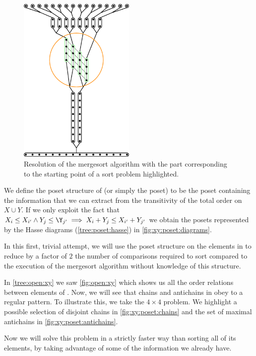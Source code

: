 \begin{figure}
\centering
\includegraphics[width=0.5\textwidth,angle=90]{fig/x+y/poset/mergexy}
\caption{Resolution of the mergesort algorithm with the part
corresponding to the starting point of a sort \XY problem highlighted.}
\label{fig:xy:poset:mergexy}
\end{figure}

We define the poset structure of \XY (or simply the \XY poset) to be the poset
containing the information that we can extract from the transitivity of the
total order on \(X \cup Y\). If we only exploit the fact that
\(X_i \le X_{i'} \land Y_j \le \Y_{j'} \implies X_i + Y_j \le X_{i'} + Y_{j'}\)
we obtain the posets represented by the Hasse diagrams (\ref{tree:poset:hasse})
in \ref{fig:xy:poset:diagrams}.

In this first, trivial attempt, we will use the poset structure on the
elements in \XY to reduce by a factor of $2$ the number of comparisons required
to sort \XY compared to the execution of the mergesort algorithm without
knowledge of this structure.

In \ref{tree:open:xy} we saw \ref{fig:open:xy} which shows us all the order
relations between elements of \XY. Now, we will see that chains and antichains
in \XY obey to a regular pattern. To illustrate this, we take the $4 \times 4$
\XY problem. We highlight a possible selection of disjoint chains in
\ref{fig:xy:poset:chains} and the set of maximal antichains in
\ref{fig:xy:poset:antichains}.

Now we will solve this problem in a strictly faster way than sorting all
of its elements, by taking advantage of some of the information we already have.

